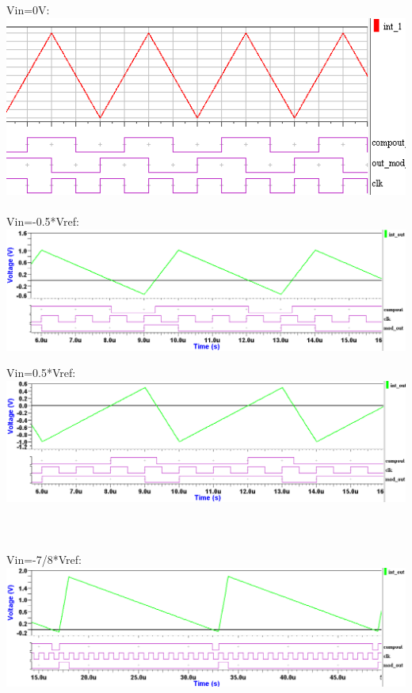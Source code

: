 \begin{minipage}{0.45\textwidth}
    Vin=0V:\\
    \includegraphics[width=1.0\textwidth]{images/Signal1}\\\\
    Vin=-0.5*Vref:\\
    \includegraphics[width=1.0\textwidth]{images/Signal3}
\end{minipage}
\hfill
\begin{minipage}{0.45\textwidth}
    Vin=0.5*Vref:\\
    \includegraphics[width=1.0\textwidth]{images/Signal2}\\\\\\\\
    Vin=-7/8*Vref:\\
    \includegraphics[width=1.0\textwidth]{images/Signal4}
\end{minipage}\\ \ \\ \ \\
